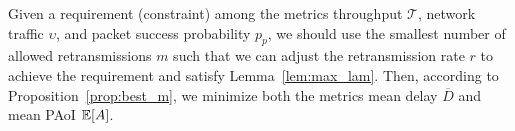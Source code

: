 
Given a requirement (constraint) among the metrics throughput $\mathscr{T}$, network traffic $\upsilon$, and packet success probability ${p_p}$, we should use the smallest number of allowed retransmissions $m$ such that we can adjust the retransmission rate $r$ to achieve the requirement and satisfy Lemma~\ref{lem:max_lam}.
%
Then, according to Proposition~\ref{prop:best_m}, we minimize both the metrics mean delay $\overline{D}$ and mean PAoI ${\mathbb E}[A]$.

